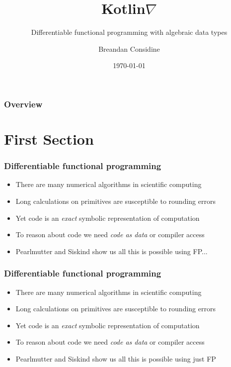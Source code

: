 \documentclass{beamer}
\title{Kotlin\texorpdfstring{$\nabla$}{}}
\subtitle{Differentiable functional programming with algebraic data types}
\author{Breandan Considine}
\institute[UdeM]{
Universit\'e de Montr\'eal \\
\medskip
\textit{breandan.considine@umontreal.ca}
}
\date{\today}
\begin{document}
    \begin{frame}
        \titlepage
    \end{frame}

    \begin{frame}
        \frametitle{Overview}
        \tableofcontents
    \end{frame}

    \section{First Section}\label{sec:first-section}


    \begin{frame}
        \frametitle{Differentiable functional programming}
        \begin{itemize}
            \item There are many numerical algorithms in scientific computing
            \item Long calculations on primitives are susceptible to rounding errors
            \item Yet code is an \textit{exact} symbolic representation of computation
            \item To reason about code we need \textit{code as data} or compiler access
            \item Pearlmutter and Siskind show us all this is possible using FP...
        \end{itemize}
    \end{frame}


    \begin{frame}
        \frametitle{Differentiable functional programming}
        \begin{itemize}
            \item There are many numerical algorithms in scientific computing
            \item Long calculations on primitives are susceptible to rounding errors
            \item Yet code is an \textit{exact} symbolic representation of computation
            \item To reason about code we need \textit{code as data} or compiler access
            \item Pearlmutter and Siskind show us all this is possible using just FP
        \end{itemize}
    \end{frame}
\end{document}
